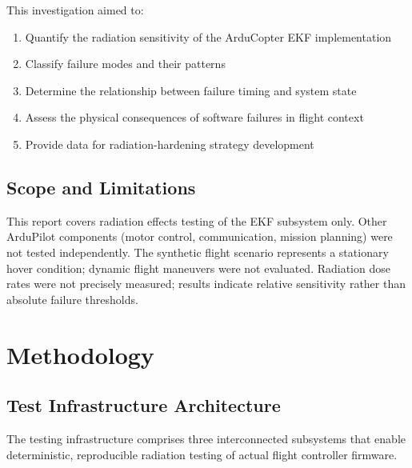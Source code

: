 \documentclass[11pt,a4paper]{article}
\begin{document}
This investigation aimed to:

\begin{enumerate}[label=\alph*)]
  \item Quantify the radiation sensitivity of the ArduCopter EKF implementation
  \item Classify failure modes and their patterns
  \item Determine the relationship between failure timing and system state
  \item Assess the physical consequences of software failures in flight context
  \item Provide data for radiation-hardening strategy development
\end{enumerate}

\subsection{Scope and Limitations}

This report covers radiation effects testing of the EKF subsystem only. Other ArduPilot components (motor control, communication, mission planning) were not tested independently. The synthetic flight scenario represents a stationary hover condition; dynamic flight maneuvers were not evaluated. Radiation dose rates were not precisely measured; results indicate relative sensitivity rather than absolute failure thresholds.

\section{Methodology}

\subsection{Test Infrastructure Architecture}

The testing infrastructure comprises three interconnected subsystems that enable deterministic, reproducible radiation testing of actual flight controller firmware.
\end{document}
